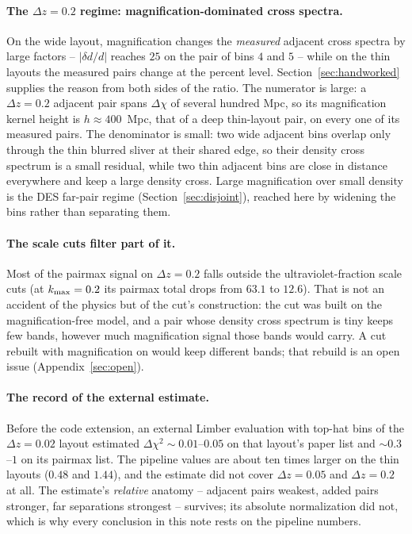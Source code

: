 \documentclass[11pt]{article}
\newcommand{\kmax}{k_{\rm max}}
\begin{document}
\paragraph{The $\Delta z = 0.2$ regime: magnification-dominated cross
spectra.}  On the wide layout, magnification changes the
\emph{measured} adjacent cross spectra by large factors --
$|\delta d / d|$ reaches $25$ on the pair of bins $4$ and $5$ --
while on the thin layouts the measured pairs change at the percent
level.  Section~\ref{sec:handworked} supplies the reason from both
sides of the ratio.  The numerator is large: a $\Delta z = 0.2$
adjacent pair spans $\Delta\chi$ of several hundred Mpc, so its
magnification kernel height is $h \approx 400$~Mpc, that of a deep
thin-layout pair, on every one of its measured pairs.  The
denominator is small: two wide adjacent bins overlap only through
the thin blurred sliver at their shared edge, so their density cross
spectrum is a small residual, while two thin adjacent bins are close
in distance everywhere and keep a large density cross.  Large
magnification over small density is the DES far-pair regime
(Section~\ref{sec:disjoint}), reached here by widening the bins
rather than separating them.

\paragraph{The scale cuts filter part of it.}  Most of the pairmax
signal on $\Delta z = 0.2$ falls outside the ultraviolet-fraction
scale cuts (at $\kmax = 0.2$ its pairmax total drops from $63.1$ to
$12.6$).  That is not an accident of the physics but of the cut's
construction: the cut was built on the magnification-free model, and
a pair whose density cross spectrum is tiny keeps few bands, however
much magnification signal those bands would carry.  A cut rebuilt
with magnification on would keep different bands; that rebuild is an
open issue (Appendix~\ref{sec:open}).

\paragraph{The record of the external estimate.}  Before the code
extension, an external Limber evaluation with top-hat bins of the
$\Delta z = 0.02$ layout estimated $\Delta\chi^2 \sim 0.01$--$0.05$
on that layout's paper list and $\sim 0.3$--$1$ on its pairmax list.
The pipeline values are about ten times larger on the thin layouts
($0.48$ and $1.44$), and the estimate did not cover
$\Delta z = 0.05$ and $\Delta z = 0.2$ at all.  The estimate's
\emph{relative} anatomy -- adjacent pairs weakest, added pairs
stronger, far separations strongest -- survives; its absolute
normalization did not, which is why every conclusion in this note
rests on the pipeline numbers.
\end{document}
